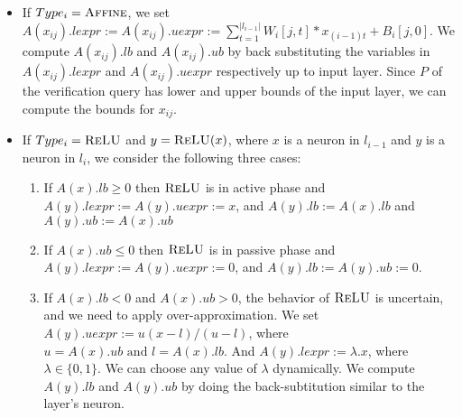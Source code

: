 \begin{itemize}
\item If $Type_i= \textsc{Affine}$, we set 
  $A(x_{ij}).lexpr := A(x_{ij}).uexpr := \sum_{t=1}^{|l_{i-1}|} W_i[j,t]*x_{(i-1)t} + B_i[j,0]$.
  We compute $A(x_{ij}).lb$ and $A(x_{ij}).ub$ by back substituting
  the variables in $A(x_{ij}).lexpr$ and $A(x_{ij}).uexpr$ respectively up to input layer.
  Since $P$ of the verification query has lower and upper bounds of the input layer,
  we can compute the bounds for $x_{ij}$.

\item If $Type_i= \textsc{ReLU}$ and $y=\textsc{ReLU}(x)$,{\color{red} where $x$ is a neuron in $l_{i-1}$ and $y$ is a neuron in $l_i$}, we consider the following three cases: %
  \begin{enumerate}
  \item \sloppy If $A(x).lb \geq 0$ then $\textsc{ReLU}$ is in active phase and
    $A(y).lexpr := A(y).uexpr := x$,
    and $A(y).lb := A(x).lb$ and $A(y).ub := A(x).ub$
  \item If $A(x).ub \leq 0$ then $\textsc{ReLU}$ is in passive phase and
    $A(y).lexpr := A(y).uexpr := 0$, 
    and $A(y).lb := A(y).ub := 0$.
  \item  If $A(x).lb < 0$ and $A(x).ub > 0$,
    the behavior of $\textsc{ReLU}$ is uncertain, and we need to apply
    over-approximation. We set $A(y).uexpr := u(x - l) / (u - l)$, 
    where $u = A(x).ub \text{ and } l = A(x).lb$.
    And $A(y).lexpr := \lambda . x$, where $\lambda \in \{0,1\}$. 
    We can choose any value of $\lambda$ dynamically.
    We compute $A(y).lb$ and $A(y).ub$ by doing the back-subtitution similar to the \affine{} layer's neuron.
  \end{enumerate}




\end{itemize}
